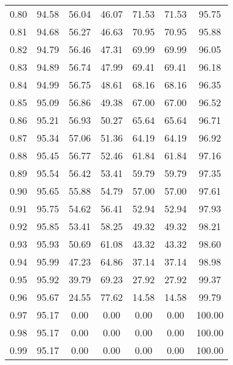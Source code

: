\begin{tabular}{|c|c|c|c|c|c|c|}
      0.80 &     94.58 &     56.04 &      46.07 &   71.53 &      71.53 &         95.75 \\
      0.81 &     94.68 &     56.27 &      46.63 &   70.95 &      70.95 &         95.88 \\
      0.82 &     94.79 &     56.46 &      47.31 &   69.99 &      69.99 &         96.05 \\
      0.83 &     94.89 &     56.74 &      47.99 &   69.41 &      69.41 &         96.18 \\
      0.84 &     94.99 &     56.75 &      48.61 &   68.16 &      68.16 &         96.35 \\
      0.85 &     95.09 &     56.86 &      49.38 &   67.00 &      67.00 &         96.52 \\
      0.86 &     95.21 &     56.93 &      50.27 &   65.64 &      65.64 &         96.71 \\
      0.87 &     95.34 &     57.06 &      51.36 &   64.19 &      64.19 &         96.92 \\
      0.88 &     95.45 &     56.77 &      52.46 &   61.84 &      61.84 &         97.16 \\
      0.89 &     95.54 &     56.42 &      53.41 &   59.79 &      59.79 &         97.35 \\
      0.90 &     95.65 &     55.88 &      54.79 &   57.00 &      57.00 &         97.61 \\
      0.91 &     95.75 &     54.62 &      56.41 &   52.94 &      52.94 &         97.93 \\
      0.92 &     95.85 &     53.41 &      58.25 &   49.32 &      49.32 &         98.21 \\
      0.93 &     95.93 &     50.69 &      61.08 &   43.32 &      43.32 &         98.60 \\
      0.94 &     95.99 &     47.23 &      64.86 &   37.14 &      37.14 &         98.98 \\
      0.95 &     95.92 &     39.79 &      69.23 &   27.92 &      27.92 &         99.37 \\
      0.96 &     95.67 &     24.55 &      77.62 &   14.58 &      14.58 &         99.79 \\
      0.97 &     95.17 &      0.00 &       0.00 &    0.00 &       0.00 &        100.00 \\
      0.98 &     95.17 &      0.00 &       0.00 &    0.00 &       0.00 &        100.00 \\
      0.99 &     95.17 &      0.00 &       0.00 &    0.00 &       0.00 &        100.00 \\
\bottomrule
\end{tabular}
